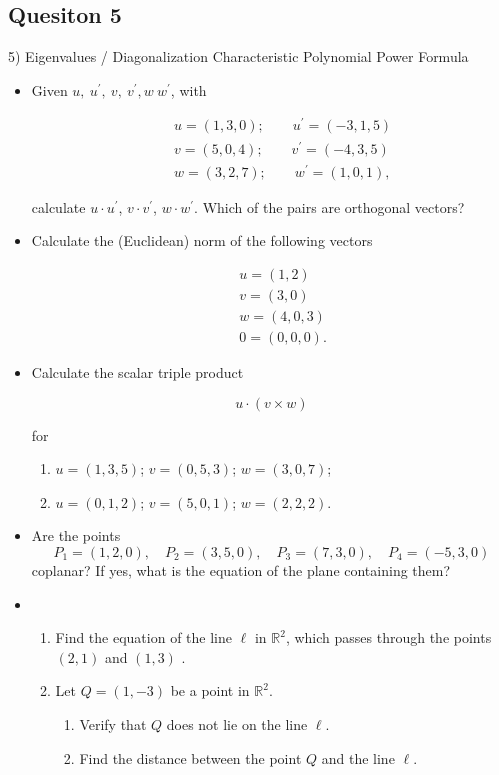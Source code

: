 \documentclass[12pt,a4paper]{article}
\begin{document}
\subsection*{Quesiton 5}
5) Eigenvalues / Diagonalization
	Characteristic Polynomial
	Power Formula
\begin{itemize}
\item Given
$u,\:u^{\prime},\:v,\:v^{\prime},w\:w^{\prime}$, with

\begin{eqnarray*}
& & u=(1,3,0);\qquad u^{\prime}=(-3,1,5)\\
& & v=(5,0,4);\qquad v^{\prime}=(-4,3,5)\\
& & w=(3,2,7);\qquad w^{\prime}=(1,0,1),
\end{eqnarray*}

calculate $u\cdot u^{\prime}$, $v\cdot v^{\prime}$, $w\cdot
w^{\prime}$. Which of the pairs are orthogonal vectors?

\vspace{0.25cm}\item Calculate the (Euclidean) norm of the
following vectors

\begin{eqnarray*}
& & u=(1,2)\\
& & v=(3,0)\\
& & w=(4,0,3)\\
& & 0=(0,0,0).
\end{eqnarray*}
\item Calculate the scalar triple product

\[u\cdot (v\times w)\]

for

\begin{enumerate}
\item $u=(1,3,5)$; $v=(0,5,3)$; $w=(3,0,7)$;

\item $u=(0,1,2)$; $v=(5,0,1)$; $w=(2,2,2).$
\end{enumerate}
\vfill\item Are the points 
$$P_1=(1,2,0), \quad P_2=(3,5,0),\quad P_3=(7,3,0), \quad P_4=(-5,3,0)
$$
coplanar? If yes, what is the equation of the plane containing them?

\vfill\item
\begin{enumerate}
\item Find the equation of the line $\ell$ in $\mathbb{R}^2$, which  passes through the 
points $(2,1)$ and $(1,3)$ .

\item  Let $Q = (1, -3)$  be a point in $\mathbb{R}^2$.
\begin{enumerate}
\item Verify that $Q$ does not lie on the line $\ell$.

\item Find the distance between the point $Q$ and the line $\ell$.
\end{enumerate}
\end{enumerate}\newpage
\vspace{0.25cm}

\end{itemize}
\end{document}
